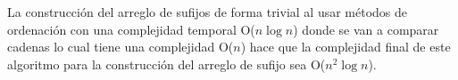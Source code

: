 La construcción del arreglo de sufijos de forma trivial al usar métodos de ordenación con una complejidad temporal O($n \log n$) donde se van a comparar cadenas lo cual tiene una complejidad O($n$) hace que la complejidad final de este algoritmo para la construcción del arreglo de sufijo sea O($n^2 \log n$).
